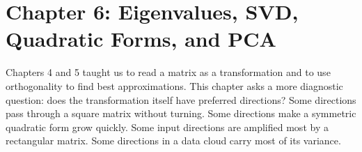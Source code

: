 \section{Chapter 6: Eigenvalues, SVD, Quadratic Forms, and PCA}
\label{ch:eigenvalues-svd-quadratic-forms-pca}

Chapters 4 and 5 taught us to read a matrix as a transformation and to use orthogonality to find best approximations. This chapter asks a more diagnostic question: does the transformation itself have preferred directions? Some directions pass through a square matrix without turning. Some directions make a symmetric quadratic form grow quickly. Some input directions are amplified most by a rectangular matrix. Some directions in a data cloud carry most of its variance.

